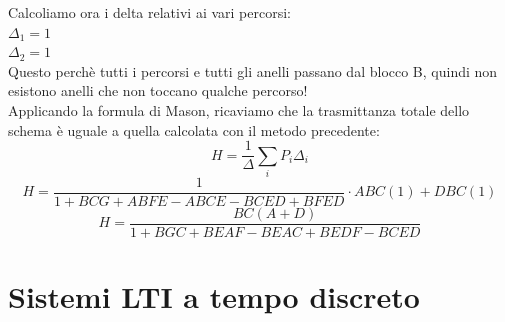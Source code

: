 \documentclass[12pt,a4paper]{article}
\begin{document}
	Calcoliamo ora i delta relativi ai vari percorsi: \\
	$\Delta_1 = 1$\\
	$\Delta_2 = 1$\\
	Questo perch\`e tutti i percorsi e tutti gli anelli passano dal blocco B, quindi non esistono anelli che non toccano qualche percorso!\\
	Applicando la formula di Mason, ricaviamo che la trasmittanza totale dello schema \`e uguale a quella calcolata con il metodo precedente:
	\[
		H = \frac{1}{\Delta}\sum_i P_i\Delta_i
	\]
	\[
		H = \frac{1}{1+BCG+ABFE-ABCE-BCED+BFED}\cdot ABC(1) + DBC(1)
	\]
	\[
		H = \frac{BC(A+D)}{1+BGC+BEAF-BEAC+BEDF-BCED}
	\]
	\newpage
	\section{Sistemi LTI a tempo discreto}
\end{document}
